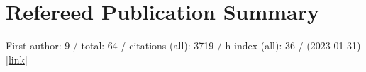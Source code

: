 \section*{Refereed Publication Summary}

First author: 9 / total: 64 / citations (all): 3719 / h-index (all): 36 / (2023-01-31) [\href{https://ui.adsabs.harvard.edu/#/public-libraries/G0Ow9TGTRyuVT7hbhzailA}{link}]
